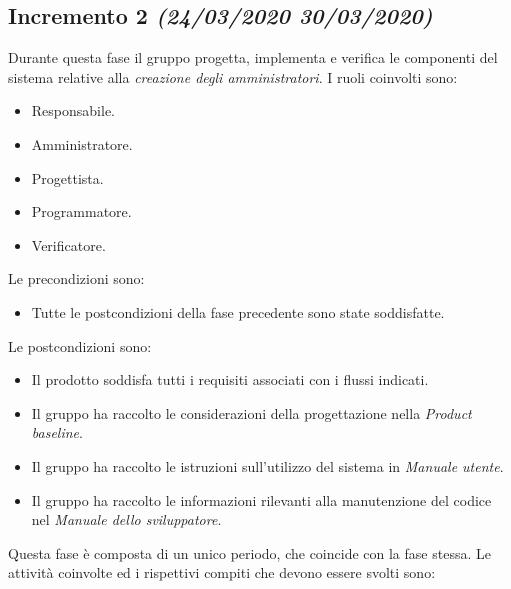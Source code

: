 \documentclass[../piano-di-progetto.tex]{subfiles}
\begin{document}
\subsection[Incremento 2]{Incremento 2 {\normalsize\normalfont\itshape(24/03/2020  30/03/2020)}}%
\label{sub:incremento_2}
Durante questa fase il gruppo progetta, implementa e verifica le componenti del sistema relative alla \textit{creazione degli amministratori}.
I ruoli coinvolti sono:
\begin{itemize}
  \item Responsabile.
  \item Amministratore.
  \item Progettista.
  \item Programmatore.
  \item Verificatore.
\end{itemize}
Le precondizioni sono:
\begin{itemize}
  \item Tutte le postcondizioni della fase precedente sono state soddisfatte.
\end{itemize}
Le postcondizioni sono:
\begin{itemize}
  \item Il prodotto soddisfa tutti i requisiti associati con i flussi indicati.
  \item Il gruppo ha raccolto le considerazioni della progettazione nella \textit{Product baseline}.
  \item Il gruppo ha raccolto le istruzioni sull'utilizzo del sistema in \textit{Manuale utente}.
  \item Il gruppo ha raccolto le informazioni rilevanti alla manutenzione del codice nel \textit{Manuale dello sviluppatore}.
\end{itemize}
Questa fase è composta di un unico periodo, che coincide con la fase stessa.
Le attività coinvolte ed i rispettivi compiti che devono essere svolti sono:
\end{document}
